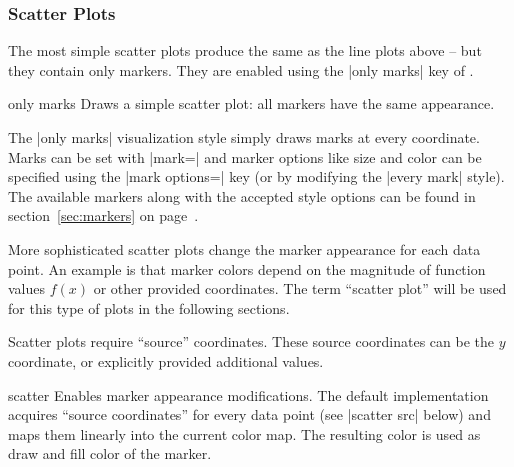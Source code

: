 {\subsubsection{Scatter Plots}
\label{sec:pgfplots:scatter:2d}
The most simple scatter plots produce the same as the line plots above -- but they contain only markers. They are enabled using the |only marks| key of \Tikz.
\begin{plottype}{only marks}
Draws a simple scatter plot: all markers have the same appearance.
\begin{codeexample}[]
\end{codeexample}
	The |only marks| visualization style simply draws marks at every coordinate. Marks can be set with |mark=| and marker options like size and color can be specified using the |mark options=| key (or by modifying the |every mark| style). The available markers along with the accepted style options can be found in section~\ref{sec:markers} on page~\pageref{sec:markers}.
\end{plottype}

\label{pgfplots:scatter}
More sophisticated scatter plots change the marker appearance for each data point. An example is that marker colors depend on the magnitude of function values $f(x)$ or other provided coordinates. The term ``scatter plot'' will be used for this type of plots in the following sections.

Scatter plots require ``source'' coordinates. These source coordinates can be the $y$ coordinate, or explicitly provided additional values.

\begin{plottype}[/pgfplots]{scatter}
	Enables marker appearance modifications. The default implementation acquires ``source coordinates'' for every data point (see |scatter src| below) and maps them linearly into the current color map. The resulting color is used as draw and fill color of the marker.

\begin{codeexample}[]
\end{codeexample}


\end{plottype}}
